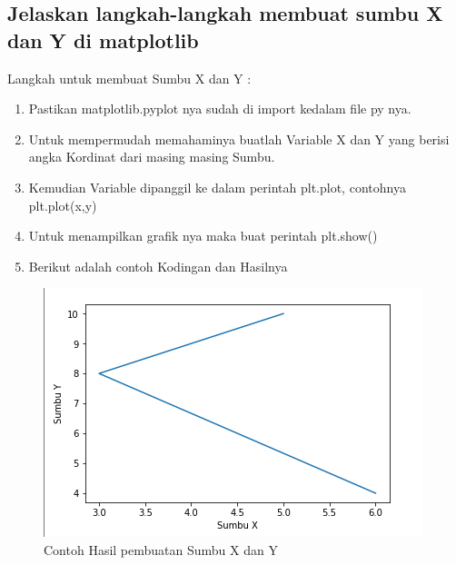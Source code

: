 

\subsection{Jelaskan langkah-langkah membuat sumbu X dan Y di matplotlib}
Langkah untuk membuat Sumbu X dan Y :
\begin{enumerate}
	\item Pastikan matplotlib.pyplot nya sudah di import kedalam file py nya.
	\item Untuk mempermudah memahaminya buatlah Variable X dan Y yang berisi angka Kordinat dari masing masing Sumbu.
	\item Kemudian Variable dipanggil ke dalam perintah plt.plot, contohnya plt.plot(x,y)
	\item Untuk menampilkan grafik nya maka buat perintah plt.show()
	\item Berikut adalah contoh Kodingan dan Hasilnya
\end{enumerate}


\begin{figure}[h]
\centering
\includegraphics[scale=0.7]{figures/6/Teori/1174002/no2.png}
\caption{Contoh Hasil pembuatan Sumbu X dan Y}
\label{fig:contoh}
\end{figure}

